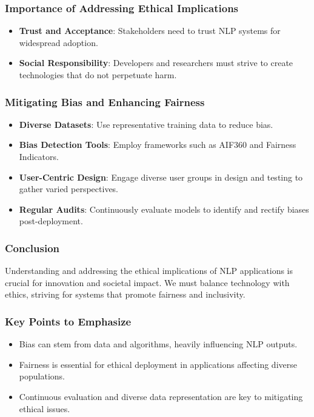 \documentclass[aspectratio=169]{beamer}
\begin{document}
\begin{frame}[fragile]
    \frametitle{Importance of Addressing Ethical Implications}
    \begin{itemize}
        \item \textbf{Trust and Acceptance}: Stakeholders need to trust NLP systems for widespread adoption.
        \item \textbf{Social Responsibility}: Developers and researchers must strive to create technologies that do not perpetuate harm.
    \end{itemize}
\end{frame}

\begin{frame}[fragile]
    \frametitle{Mitigating Bias and Enhancing Fairness}
    \begin{itemize}
        \item \textbf{Diverse Datasets}: Use representative training data to reduce bias.
        \item \textbf{Bias Detection Tools}: Employ frameworks such as AIF360 and Fairness Indicators.
        \item \textbf{User-Centric Design}: Engage diverse user groups in design and testing to gather varied perspectives.
        \item \textbf{Regular Audits}: Continuously evaluate models to identify and rectify biases post-deployment.
    \end{itemize}
\end{frame}

\begin{frame}[fragile]
    \frametitle{Conclusion}
    Understanding and addressing the ethical implications of NLP applications is crucial for innovation and societal impact. 
    We must balance technology with ethics, striving for systems that promote fairness and inclusivity.
\end{frame}

\begin{frame}[fragile]
    \frametitle{Key Points to Emphasize}
    \begin{itemize}
        \item Bias can stem from data and algorithms, heavily influencing NLP outputs.
        \item Fairness is essential for ethical deployment in applications affecting diverse populations.
        \item Continuous evaluation and diverse data representation are key to mitigating ethical issues.
    \end{itemize}
\end{frame}
\end{document}
